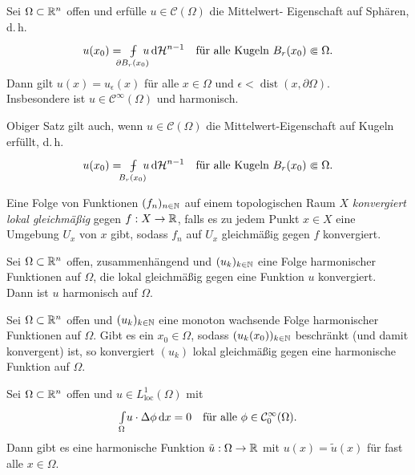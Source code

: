 \documentclass{cheat-sheet}
\newcommand{\HM}{\mathcal{H}} %
\DeclareMathOperator{\dist}{dist} %
\def\Xint#1{\mathchoice
   {\XXint\displaystyle\textstyle{#1}}%
   {\XXint\textstyle\scriptstyle{#1}}%
   {\XXint\scriptstyle\scriptscriptstyle{#1}}%
   {\XXint\scriptscriptstyle\scriptscriptstyle{#1}}%
   \!\int}
\def\XXint#1#2#3{{\setbox0=\hbox{$#1{#2#3}{\int}$}
     \vcenter{\hbox{$#2#3$}}\kern-.5\wd0}}
\def\dashint{\Xint-}
\newcommand{\mymvint}[2]{{\textstyle \dashint\limits_{#1}^{#2}}}
\newcommand{\MVInt}[4]{\mymvint{#1}{#2} #3 \,\d #4}
\begin{document}


\begin{satz}
  Sei $\Omega \subset \mathbb{R}^n$ offen und erfülle $u \in \mathcal{C}(\Omega)$ die Mittelwert- Eigenschaft auf Sphären, d.\,h.
  \[
    u(x_0) = \enspace\MVInt{\mathclap{\partial B_r(x_0)}}{}{\enspace u}{\HM^{n-1}}
    \quad \text{für alle Kugeln $B_r(x_0) \Subset \Omega$.}
  \]
  Dann gilt $u(x) = u_\epsilon(x)$ für alle $x \in \Omega$ und $\epsilon < \dist(x, \partial \Omega)$.\\
  Insbesondere ist $u \in \mathcal{C}^\infty(\Omega)$ und harmonisch.
\end{satz}

\begin{kor}
  Obiger Satz gilt auch, wenn $u \in \mathcal{C}(\Omega)$ die Mittelwert-Eigenschaft auf Kugeln erfüllt, d.\,h.
  \[
    u(x_0) = \enspace\MVInt{\mathclap{B_r(x_0)}}{}{\enspace u}{\HM^{n-1}}
    \quad \text{für alle Kugeln $B_r(x_0) \Subset \Omega$.}
  \]
\end{kor}

\begin{defn}
  Eine Folge von Funktionen $(f_n)_{n \in \mathbb{N}}$ auf einem topologischen Raum $X$ \emph{konvergiert lokal gleichmäßig} gegen $f : X \to \mathbb{R}$, falls es zu jedem Punkt $x \in X$ eine Umgebung $U_x$ von $x$ gibt, sodass $f_n$ auf $U_x$ gleichmäßig gegen $f$ konvergiert.
\end{defn}

\begin{kor}
  Sei $\Omega \subset \mathbb{R}^n$ offen, zusammenhängend und $(u_k)_{k \in \mathbb{N}}$ eine Folge harmonischer Funktionen auf $\Omega$, die lokal gleichmäßig gegen eine Funktion $u$ konvergiert.\\
  Dann ist $u$ harmonisch auf $\Omega$.
\end{kor}

\begin{kor}
  Sei $\Omega \subset \mathbb{R}^n$ offen und $(u_k)_{k \in \mathbb{N}}$ eine monoton wachsende Folge harmonischer Funktionen auf $\Omega$. Gibt es ein $x_0 \in \Omega$, sodass $(u_k(x_0))_{k \in \mathbb{N}}$ beschränkt (und damit konvergent) ist, so konvergiert $(u_k)$ lokal gleichmäßig gegen eine harmonische Funktion auf $\Omega$.
\end{kor}

\begin{satz}
  Sei $\Omega \subset \mathbb{R}^n$ offen und $u \in L_{\text{loc}}^1(\Omega)$ mit
  \[
    {\textstyle \int\limits_{\Omega}^{}} u \cdot \Delta \phi \,\mathrm{d} x = 0
    \quad \text{für alle $\phi \in \mathcal{C}_0^\infty(\Omega)$.}
  \]
  Dann gibt es eine harmonische Funktion $\tilde{u} : \Omega \to \mathbb{R}$ mit $u(x) = \tilde{u}(x)$ für fast alle $x \in \Omega$.
\end{satz}
\end{document}
